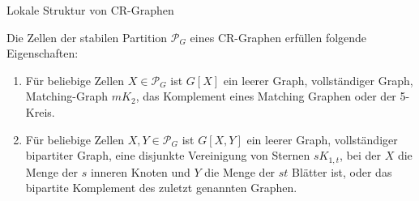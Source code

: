 \documentclass{beamer}
\begin{document}
	\begin{frame}{Lokale Struktur von CR-Graphen}
		\begin{Lemma}
			Die Zellen der stabilen Partition $\mathcal{P}_G$ eines CR-Graphen erfüllen folgende Eigenschaften:
			
			\begin{enumerate}[label=(\Alph*)]
				\item Für beliebige Zellen $X\in \mathcal{P}_G$ ist $G[X]$ ein \alert{leerer Graph}, \alert{vollständiger Graph}, \alert{Matching-Graph} $mK_2$, das \alert{Komplement eines Matching Graphen} oder der \alert{5-Kreis}.
				\pause
				\item Für beliebige Zellen $X,Y\in \mathcal{P}_G$ ist $G[X,Y]$ ein \alert{leerer Graph}, \alert{vollständiger bipartiter Graph}, eine \alert{disjunkte Vereinigung von Sternen} $sK_{1,t}$, bei der $X$ die Menge der $s$ inneren Knoten und $Y$ die Menge der $st$ Blätter ist, oder das \alert{bipartite Komplement des zuletzt genannten Graphen}.
			\end{enumerate}
		\end{Lemma}
	\end{frame}
\end{document}
